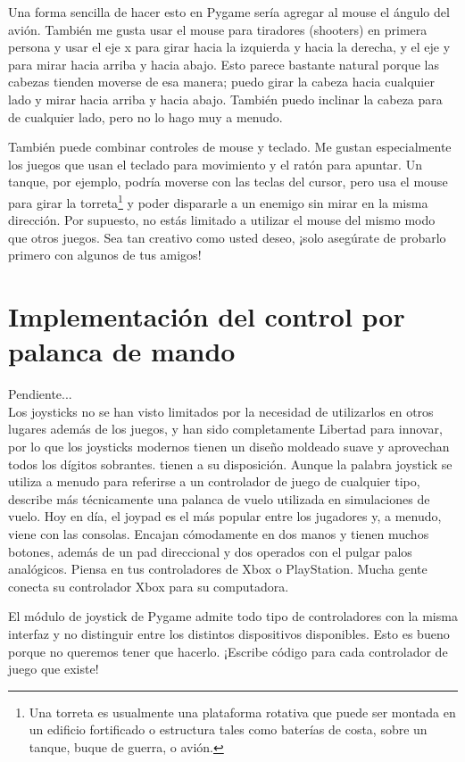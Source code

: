 {Una forma sencilla de hacer esto en Pygame sería agregar al mouse el ángulo del avión. También me gusta usar el mouse para
tiradores (shooters) en primera persona y usar el eje x para girar hacia la izquierda y hacia la derecha, y el eje y para mirar 
hacia arriba y hacia abajo. Esto parece bastante natural porque las cabezas tienden moverse de esa manera; puedo girar la 
cabeza hacia cualquier lado y mirar hacia arriba y hacia abajo. También puedo inclinar la cabeza para de cualquier lado, 
pero no lo hago muy a menudo. 

También puede combinar controles de mouse y teclado. Me gustan especialmente los juegos que usan el teclado para
movimiento y el ratón para apuntar. Un tanque, por ejemplo, podría moverse con las teclas del cursor, pero usa el mouse
para girar la torreta\footnote{Una torreta es usualmente una plataforma rotativa que puede ser montada en un edificio fortificado o estructura tales como baterías de costa, sobre un tanque, buque de guerra, o avión.} y poder dispararle a un enemigo sin mirar en la misma dirección. Por supuesto, no estás limitado a utilizar el mouse del mismo modo que otros juegos. Sea tan creativo como usted
deseo, ¡solo asegúrate de probarlo primero con algunos de tus amigos!





\section{Implementación del control por palanca de mando}
Pendiente...\\

Los joysticks no se han visto limitados por la necesidad de utilizarlos en otros lugares además de los juegos, y han sido completamente
Libertad para innovar, por lo que los joysticks modernos tienen un diseño moldeado suave y aprovechan todos los dígitos sobrantes.
tienen a su disposición. Aunque la palabra joystick se utiliza a menudo para referirse a un controlador de juego de cualquier tipo,
describe más técnicamente una palanca de vuelo utilizada en simulaciones de vuelo.
Hoy en día, el joypad es el más popular entre los jugadores y, a menudo, viene con las consolas. Encajan
cómodamente en dos manos y tienen muchos botones, además de un pad direccional y dos operados con el pulgar
palos analógicos. Piensa en tus controladores de Xbox o PlayStation. Mucha gente conecta su controlador Xbox para
su computadora.

El módulo de joystick de Pygame admite todo tipo de controladores con la misma interfaz y no
distinguir entre los distintos dispositivos disponibles. Esto es bueno porque no queremos tener que hacerlo.
¡Escribe código para cada controlador de juego que existe!


}
